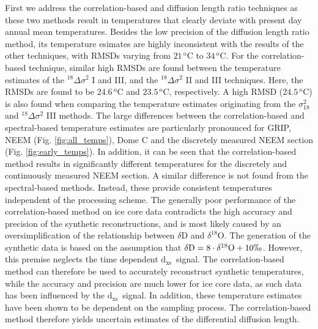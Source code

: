 \documentclass[11pt, draftcls, onecolumn]{IEEEtran} %
\numberwithin{equation}{section}
\numberwithin{table}{section}
\numberwithin{figure}{section}
\newcommand{\Dxs}{$\mathrm{d_{xs}}$}
\begin{document}
First we address the correlation-based and diffusion length ratio techniques as these two
methods result in temperatures that clearly deviate with present day annual mean temperatures.
Besides the low precision of the diffusion length ratio method, 
its temperature esimates are highly inconsistent with the results of the 
other techniques, with RMSDs varying from $21\, ^\mathrm{o}\mathrm{C}$ to $34 \, ^\mathrm{o}\mathrm{C}$. 
For the correlation-based technique,
similar high RMSDs are found between the temperature estimates of the ${}^{18}\Delta\sigma^2$ I and III, and the ${}^{18}\Delta\sigma^2$ II and III techniques. Here, the RMSDs are found to be $24.6\,^\mathrm{o}\mathrm{C}$ and $23.5\,^\mathrm{o}\mathrm{C}$, respectively.
A high RMSD ($24.5\,^\mathrm{o}\mathrm{C}$) is also found when comparing the temperature estimates originating from the $\sigma^2_{18}$ and ${}^{18}\Delta\sigma^2$ III methods. 
The large differences between the correlation-based and spectral-based temperature estimates are particularly pronounced for GRIP, NEEM (Fig. \ref{fig:all_temps}), Dome C and the discretely measured NEEM section (Fig. \ref{fig:early_temps}).
In addition, it can be seen that the correlation-based method results in significantly different 
temperatures for the discretely and continuously measured NEEM section.
A similar difference is not found from the spectral-based methods. Instead, these provide
consistent temperatures independent of the processing scheme.
The generally poor performance of the correlation-based method on ice core data contradicts the high accuracy and precision of the synthetic reconstructions, and is most likely caused by an oversimplification of the relationship between $\delta\mathrm{D}$ and $\delta^{18}\mathrm{O}$. The generation of the synthetic data is based on the assumption that $\delta\mathrm{D} = 8\cdot \delta^{18}\mathrm{O} + 10 \permil$. However, this premise neglects the time dependent \Dxs~signal. 
The correlation-based method can therefore be used to accurately reconstruct synthetic temperatures, while the accuracy and precision are much lower for ice core data,
as such data has been influenced by the \Dxs~signal.
In addition, these temperature estimates have been shown to be dependent on the sampling process. The correlation-based method therefore yields uncertain estimates of the differential diffusion length.
\end{document}
